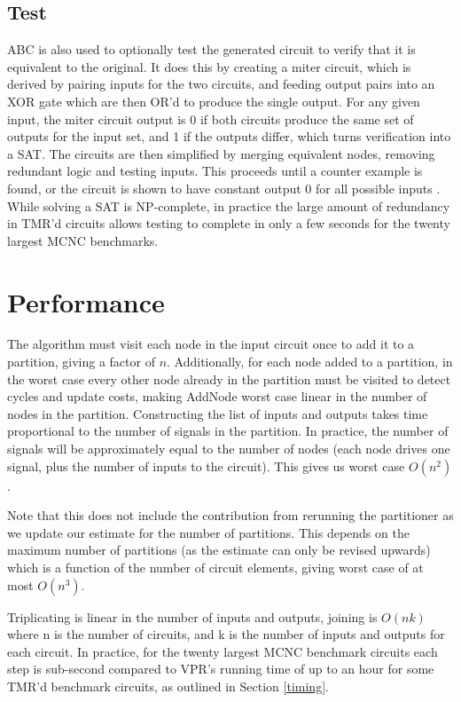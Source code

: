 \documentclass[12pt,final,oneside]{dwThesis} %
\begin{document}
   \subsection{Test}
   \label{algTest} \gls{ABC} is also used to optionally test
   the generated circuit to verify that it is equivalent to the original. It
   does this by creating a miter circuit, which is derived by pairing inputs
   for the two circuits, and feeding output pairs into an XOR gate which are
   then OR'd to produce the single output. For any given input, the miter
   circuit output is 0 if both circuits produce the same set of outputs for the
   input set, and 1 if the outputs differ, which turns verification into a
   \gls{SAT}.  The circuits are then simplified by merging equivalent nodes,
   removing redundant logic and testing inputs.
   This proceeds until a counter example is found, or the circuit is shown to
   have constant output 0 for all possible inputs \cite{abcSEC, abcCEC}.  While
   solving a \gls{SAT} is NP-complete, in practice the large amount of
   redundancy in \gls{TMR}'d circuits allows testing to complete in only a few
   seconds for the twenty largest \gls{MCNC} benchmarks.


   \section{Performance}
   The algorithm must visit each node in the input
   circuit once to add it to a partition, giving a factor of $n$.
   Additionally, for each node added to a partition, in the worst case every
   other node already in the partition must be visited to detect cycles and
   update costs, making AddNode worst case linear in the number of nodes in the
   partition.  Constructing the list of inputs and outputs takes time
   proportional to the number of signals in the partition. In practice, the
   number of signals will be approximately equal to the number of nodes (each
   node drives one signal, plus the number of inputs to the circuit).  This
   gives us worst case $O(n^2)$.
   
   Note that this does not include the contribution from rerunning the partitioner as we update our estimate for the number of partitions.
   This depends on the maximum number of partitions (as the estimate can only be revised upwards) which is a function of the number of circuit elements,
   giving worst case of at most $O(n^3)$. 
   
   
   Triplicating is linear in the number of
   inputs and outputs, joining is $O(nk)$ where n is the number of circuits,
   and k is the number of inputs and outputs for each circuit.  In practice, for the twenty
   largest \gls{MCNC} benchmark circuits each step is sub-second
   compared to \gls{VPR}'s running time of up to an hour for some \gls{TMR}'d
   benchmark circuits, as outlined in Section \ref{timing}.
\end{document}

